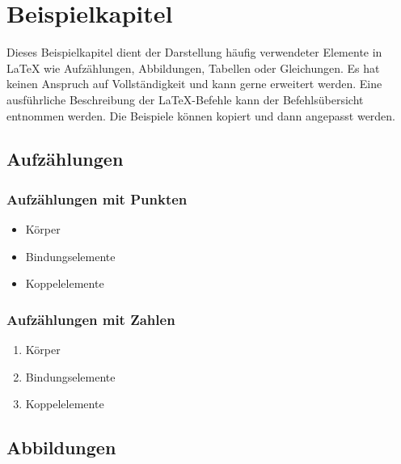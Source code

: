 \chapter{Beispielkapitel}
\label{cha:beispielkapitel}
Dieses Beispielkapitel dient der Darstellung häufig verwendeter Elemente in LaTeX wie Aufzählungen, Abbildungen, Tabellen oder Gleichungen. Es hat keinen Anspruch auf Vollständigkeit und kann gerne erweitert werden. Eine ausführliche Beschreibung der LaTeX-Befehle kann der Befehlsübersicht entnommen werden.
Die  Beispiele können kopiert und dann angepasst werden.  
\section{Aufzählungen}
\label{sec:aufzaehlungen}

\subsection{Aufzählungen mit Punkten}
\label{aufzaehlung_punkte}

\begin{itemize}
	\item Körper
	\item Bindungselemente
	\item Koppelelemente
\end{itemize}

\subsection{Aufzählungen mit Zahlen}
\label{aufzaehlung_zaheln}

\begin{enumerate}
	\item Körper
	\item Bindungselemente
	\item Koppelelemente
\end{enumerate}

\cleardoublepage
\section{Abbildungen}
\label{sec:abbildungen}

